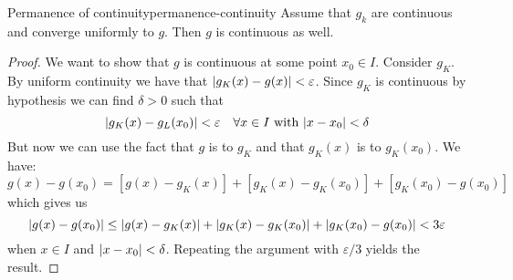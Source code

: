 \documentclass[12pt]{extarticle}
\begin{document}
\begin{theorem}{Permanence of continuity}{permanence-continuity}
    Assume that $g_k$ are continuous and converge uniformly to $g$. Then $g$ is continuous as well.
\end{theorem}
\begin{proof}
    We want to show that $g$ is continuous at some point $x_0 \in I$.
    Consider $g_K$. By uniform continuity we have that $\abs{g_K(x) - g(x)} < \varepsilon$.
    Since $g_K$ is continuous by hypothesis we can find $\delta > 0$ such that
    \begin{equation}
        \abs{g_K(x) - g_L(x_0)} < \varepsilon \quad \forall x \in I \text{ with } \abs{x - x_0} < \delta
    \end{equation}
    But now we can use the fact that $g$ is  to $g_K$ and that $g_K(x)$ is  to $g_K(x_0)$.
    We have:
    \begin{equation}
        g(x) - g(x_0) = [g(x) -g_K(x)] + [g_K(x) - g_K(x_0)] + [g_K(x_0) - g(x_0)]
    \end{equation}
    which gives us
    \begin{equation}
        \abs{g(x) - g(x_0)} \leq \abs{g(x) -g_K(x)} + \abs{g_K(x) - g_K(x_0)} +\abs{g_K(x_0) - g(x_0)} < 3 \varepsilon
    \end{equation}
    when $x \in I$ and $\abs{x - x_0} < \delta$.
    Repeating the argument with $\varepsilon/3$ yields the result.
\end{proof}
\end{document}
